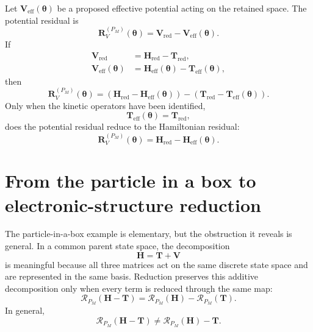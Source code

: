 Let $\mathbf V_{\mathrm{eff}}(\boldsymbol\theta)$ be a proposed effective
potential acting on the retained space. The potential residual is
\begin{equation}
    \mathbf R_V^{(P_M)}(\boldsymbol\theta)
    =
    \mathbf V_{\mathrm{red}}
    -
    \mathbf V_{\mathrm{eff}}(\boldsymbol\theta).
\end{equation}
If
\begin{align}
    \mathbf V_{\mathrm{red}}
    &=
    \mathbf H_{\mathrm{red}}-\mathbf T_{\mathrm{red}},
    \\
    \mathbf V_{\mathrm{eff}}(\boldsymbol\theta)
    &=
    \mathbf H_{\mathrm{eff}}(\boldsymbol\theta)
    -
    \mathbf T_{\mathrm{eff}}(\boldsymbol\theta),
\end{align}
then
\begin{equation}
    \mathbf R_V^{(P_M)}(\boldsymbol\theta)
    =
    \left(
        \mathbf H_{\mathrm{red}}
        -
        \mathbf H_{\mathrm{eff}}(\boldsymbol\theta)
    \right)
    -
    \left(
        \mathbf T_{\mathrm{red}}
        -
        \mathbf T_{\mathrm{eff}}(\boldsymbol\theta)
    \right).
\end{equation}
Only when the kinetic operators have been identified,
\begin{equation}
    \mathbf T_{\mathrm{eff}}(\boldsymbol\theta)
    =
    \mathbf T_{\mathrm{red}},
\end{equation}
does the potential residual reduce to the Hamiltonian residual:
\begin{equation}
    \mathbf R_V^{(P_M)}(\boldsymbol\theta)
    =
    \mathbf H_{\mathrm{red}}
    -
    \mathbf H_{\mathrm{eff}}(\boldsymbol\theta).
\end{equation}

\section{From the particle in a box to electronic-structure reduction}

The particle-in-a-box example is elementary, but the obstruction it reveals is
general. In a common parent state space, the decomposition
\begin{equation}
    \mathbf H=\mathbf T+\mathbf V
\end{equation}
is meaningful because all three matrices act on the same discrete state space
and are represented in the same basis. Reduction preserves this additive
decomposition only when every term is reduced through the same map:
\begin{equation}
    \mathcal R_{P_M}(\mathbf H-\mathbf T)
    =
    \mathcal R_{P_M}(\mathbf H)
    -
    \mathcal R_{P_M}(\mathbf T).
\end{equation}
In general,
\begin{equation}
    \mathcal R_{P_M}(\mathbf H-\mathbf T)
    \neq
    \mathcal R_{P_M}(\mathbf H)-\mathbf T.
\end{equation}


